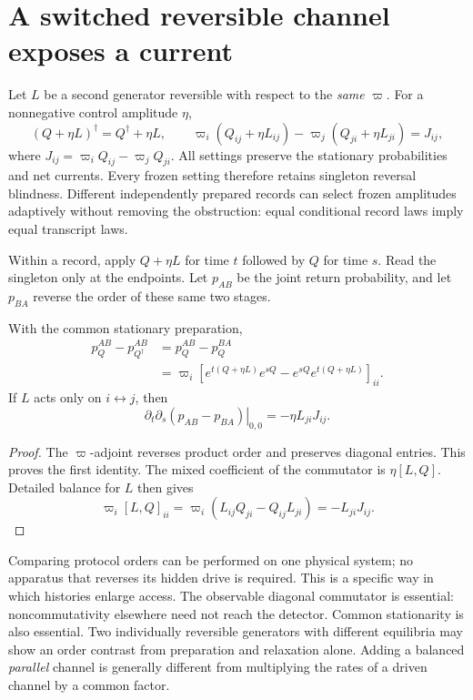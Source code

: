 \section{A switched reversible channel exposes a current}

Let $L$ be a second generator reversible with respect to the \emph{same}
$\varpi$. For a nonnegative control amplitude $\eta$,
\begin{equation}
 (Q+\eta L)^\dagger=Q^\dagger+\eta L,\qquad
 \varpi_i(Q_{ij}+\eta L_{ij})-\varpi_j(Q_{ji}+\eta L_{ji})
 =J_{ij},
\end{equation}
where $J_{ij}=\varpi_iQ_{ij}-\varpi_jQ_{ji}$. All settings preserve the
stationary probabilities and net currents. Every frozen setting therefore
retains singleton reversal blindness. Different independently prepared
records can select frozen amplitudes adaptively without removing the
obstruction: equal conditional record laws imply equal transcript laws.

Within a record, apply $Q+\eta L$ for time $t$ followed by $Q$ for time $s$.
Read the singleton only at the endpoints. Let $p_{AB}$ be the joint return
probability, and let $p_{BA}$ reverse the order of these same two stages.

\begin{proposition}
\label{prop:continuous-switch}
With the common stationary preparation,
\begin{align}
 p_Q^{AB}-p_{Q^\dagger}^{AB}
 &=p_Q^{AB}-p_Q^{BA}\nonumber\\
 &=\varpi_i[e^{t(Q+\eta L)}e^{sQ}
                    -e^{sQ}e^{t(Q+\eta L)}]_{ii}.
 \label{eq:continuous-switch}
\end{align}
If $L$ acts only on $i\leftrightarrow j$, then
\begin{equation}
 \left.\partial_t\partial_s(p_{AB}-p_{BA})\right|_{0,0}
       =-\eta L_{ji}J_{ij}.
 \label{eq:continuous-current}
\end{equation}
\end{proposition}
\begin{proof}
The $\varpi$-adjoint reverses product order and preserves diagonal entries.
This proves the first identity. The mixed coefficient of the commutator is
$\eta[L,Q]$. Detailed balance for $L$ then gives
\[
 \varpi_i[L,Q]_{ii}
  =\varpi_i(L_{ij}Q_{ji}-Q_{ij}L_{ji})=-L_{ji}J_{ij}.
\]
\end{proof}

Comparing protocol orders can be performed on one physical system; no
apparatus that reverses its hidden drive is required. This is a specific way
in which histories enlarge access. The observable diagonal commutator is
essential: noncommutativity elsewhere need not reach the detector.
Common stationarity is also essential. Two individually reversible generators
with different equilibria may show an order contrast from preparation and
relaxation alone. Adding a balanced \emph{parallel} channel is generally
different from multiplying the rates of a driven channel by a common factor.

